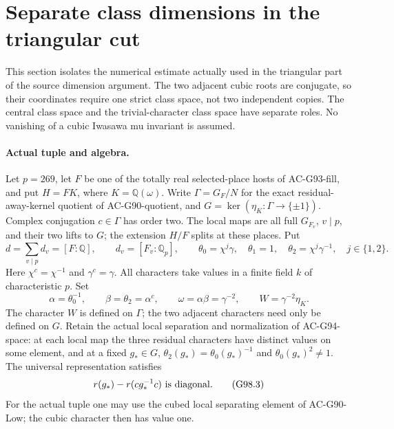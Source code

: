 \section{Separate class dimensions in the triangular cut}
\label{sec:cubic-sharpened-dimension-gap}

This section isolates the numerical estimate actually used in the
triangular part of the source dimension argument.  The two adjacent
cubic roots are conjugate, so their coordinates require one strict
class space, not two independent copies.  The central class space
and the trivial-character class space have separate roles.  No
vanishing of a cubic Iwasawa mu invariant is assumed.

\paragraph{Actual tuple and algebra.}
Let $p=269$, let $F$ be one of the totally real selected-place hosts
of AC-G93-fill, and put $H=FK$, where $K=\mathbb Q(\omega)$.
Write $\Gamma=G_F/N$ for the exact residual-away-kernel quotient
of AC-G90-quotient, and $G=\ker(\eta_K:\Gamma\to\{\pm1\})$.
Complex conjugation $c\in\Gamma$ has order two.  The local maps are
all full $G_{F_v}$, $v\mid p$, and their two lifts to $G$; the
extension $H/F$ splits at these places.  Put
\[
 d=\sum_{v\mid p}d_v=[F:\mathbb Q],\qquad
 d_v=[F_v:\mathbb Q_p],\qquad
 \theta_0=\chi^j\gamma,\quad\theta_1=1,\quad
 \theta_2=\chi^j\gamma^{-1},\quad j\in\{1,2\}.
 \tag{G98.1}
\]
Here $\chi^c=\chi^{-1}$ and $\gamma^c=\gamma$.
All characters take values in a finite field $k$ of characteristic
$p$.  Set
\[
 \alpha=\theta_0^{-1},\qquad \beta=\theta_2=\alpha^c,
 \qquad\omega=\alpha\beta=\gamma^{-2},\qquad
 W=\gamma^{-2}\eta_K.
 \tag{G98.2}
\]
The character $W$ is defined on $\Gamma$; the two adjacent
characters need only be defined on $G$.
Retain the actual local separation and normalization of AC-G94-space:
at each local map the three residual characters have distinct values
on some element, and at a fixed $g_*\in G$,
$\theta_2(g_*)=\theta_0(g_*)^{-1}$ and
$\theta_0(g_*)^2\ne1$.  The universal representation satisfies
\[
 r(g_*)-r(cg_*^{-1}c)\ \hbox{is diagonal}.
 \tag{G98.3}
\]
For the actual tuple one may use the cubed local separating element
of AC-G90-Low; the cubic character then has value one.

